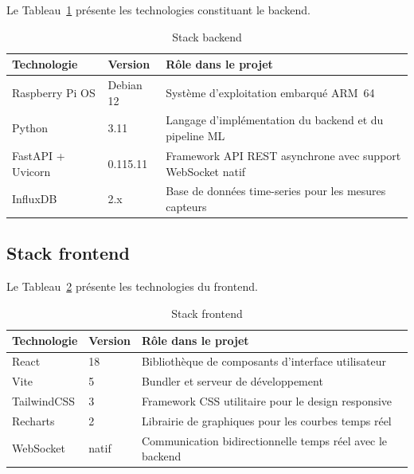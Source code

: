 Le Tableau~\ref{tab:stack_backend} présente les technologies constituant le backend.

\begin{table}[htbp]
\centering
\renewcommand{\arraystretch}{1.45}
\caption{Stack backend}
\label{tab:stack_backend}
\begin{tabular}{|p{}|p{}|p{}|}
\hline
\rowcolor{gray!25}
\textbf{Technologie} & \textbf{Version} & \textbf{Rôle dans le projet} \\
\hline
Raspberry Pi OS & Debian 12 & Système d'exploitation embarqué ARM~64 \\
\hline
Python & 3.11 & Langage d'implémentation du backend et du pipeline ML \\
\hline
FastAPI + Uvicorn & 0.115.11 & Framework API REST asynchrone avec support WebSocket natif \\
\hline
InfluxDB & 2.x & Base de données time-series pour les mesures capteurs \\
\hline
\end{tabular}
\end{table}

\subsection{Stack frontend}

Le Tableau~\ref{tab:stack_frontend} présente les technologies du frontend.

\begin{table}[htbp]
\centering
\renewcommand{\arraystretch}{1.45}
\caption{Stack frontend}
\label{tab:stack_frontend}
\begin{tabular}{|p{}|p{}|p{}|}
\hline
\rowcolor{gray!25}
\textbf{Technologie} & \textbf{Version} & \textbf{Rôle dans le projet} \\
\hline
React & 18 & Bibliothèque de composants d'interface utilisateur \\
\hline
Vite & 5 & Bundler et serveur de développement \\
\hline
TailwindCSS & 3 & Framework CSS utilitaire pour le design responsive \\
\hline
Recharts & 2 & Librairie de graphiques pour les courbes temps réel \\
\hline
WebSocket & natif & Communication bidirectionnelle temps réel avec le backend \\
\hline
\end{tabular}
\end{table}

